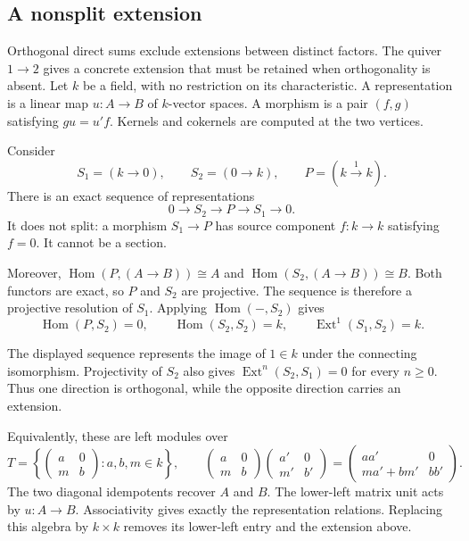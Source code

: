 \subsection{A nonsplit extension}

Orthogonal direct sums exclude extensions between distinct factors.
The quiver $1\to2$ gives a concrete extension that must be retained when
orthogonality is absent. Let $k$ be a field, with no restriction on its
characteristic. A representation is a linear map $u:A\to B$ of
$k$-vector spaces. A morphism is a pair $(f,g)$ satisfying $gu=u'f$.
Kernels and cokernels are computed at the two vertices.

Consider
\[
 S_1=(k\to0),\qquad S_2=(0\to k),\qquad P=(k\xrightarrow{1}k).
\]
There is an exact sequence of representations
\[
 0\longrightarrow S_2\longrightarrow P\longrightarrow S_1
   \longrightarrow0.
\]
It does not split: a morphism $S_1\to P$ has source component
$f:k\to k$ satisfying $f=0$. It cannot be a section.

Moreover, $\operatorname{Hom}(P,(A\to B))\cong A$ and
$\operatorname{Hom}(S_2,(A\to B))\cong B$.
Both functors are exact, so $P$ and $S_2$ are projective.
The sequence is therefore a projective resolution of $S_1$.
Applying $\operatorname{Hom}(-,S_2)$ gives
\[
 \operatorname{Hom}(P,S_2)=0,\qquad
 \operatorname{Hom}(S_2,S_2)=k,\qquad
 \operatorname{Ext}^1(S_1,S_2)=k.
\]

The displayed sequence represents the image of $1\in k$ under the
connecting isomorphism. Projectivity of $S_2$ also gives
$\operatorname{Ext}^n(S_2,S_1)=0$ for every $n\ge0$.
Thus one direction is orthogonal, while the opposite direction carries
an extension.

Equivalently, these are left modules over
\[
 T=\left\{\begin{pmatrix}a&0\\m&b\end{pmatrix}:a,b,m\in k\right\},
 \qquad
 \begin{pmatrix}a&0\\m&b\end{pmatrix}
 \begin{pmatrix}a'&0\\m'&b'\end{pmatrix}
 =\begin{pmatrix}aa'&0\\ma'+bm'&bb'\end{pmatrix}.
\]
The two diagonal idempotents recover $A$ and $B$. The lower-left matrix
unit acts by $u:A\to B$. Associativity gives exactly the representation
relations. Replacing this algebra by $k\times k$ removes its lower-left
entry and the extension above.

